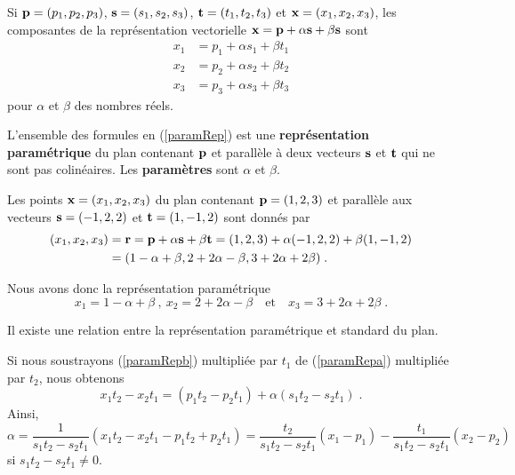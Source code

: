 {Si $\mathbf{p}=(p_1,p_2,p_3)$, $\mathbf{s} = (s_1,s_2,s_3)$,
$\mathbf{t}=(t_1,t_2,t_3)$ et $\mathbf{x}=(x_1,x_2,x_3)$, les composantes de la
représentation vectorielle
$\mathbf{x} = \mathbf{p} + \alpha \mathbf{s} + \beta \mathbf{s}$ sont
\begin{subequations} \label{paramRep}
\begin{align}
x_1 &= p_1 + \alpha s_1 + \beta t_1 \label{paramRepa} \\
x_2 &= p_2 + \alpha s_2 + \beta t_2 \label{paramRepb} \\
x_3 &= p_3 + \alpha s_3 + \beta t_3 \label{paramRepc}
\end{align}
\end{subequations}
pour $\alpha$ et $\beta$ des nombres réels.

\begin{focus}{\dfn} 
L'ensemble des formules en (\ref{paramRep}) est une {\bfseries
représentation paramétrique} du plan contenant $\mathbf{p}$ et parallèle
à deux vecteurs $\mathbf{s}$ et $\mathbf{t}$ qui ne sont pas colinéaires.
Les {\bfseries paramètres} sont $\alpha$ et $\beta$.
\end{focus}

\begin{egg}
Les points $\mathbf{x}=(x_1,x_2,x_3)$ du plan contenant $\mathbf{p}=(1,2,3)$ et
parallèle aux vecteurs $\mathbf{s}=(-1,2,2)$ et $\mathbf{t}=(1,-1,2)$ sont
donnés par
\begin{align*}
(x_1,x_2,x_3) &= \mathbf{r} = \mathbf{p} + \alpha \mathbf{s} + \beta \mathbf{t}
= (1,2,3) + \alpha (-1,2,2) + \beta (1,-1,2) \\
&= (1-\alpha +\beta, 2 +2 \alpha - \beta, 3 + 2\alpha +2\beta) \; .
\end{align*}

Nous avons donc la représentation paramétrique
\[
x_1 = 1-\alpha+\beta \ , \ x_2 = 2+2\alpha-\beta \quad \text{et} \quad 
x_3 = 3+2\alpha + 2\beta \; .
\]
\end{egg}

\begin{rmk}[\theory]
Il existe une relation entre la représentation paramétrique et standard du
plan.

Si nous soustrayons (\ref{paramRepb}) multipliée par $t_1$ de
(\ref{paramRepa}) multipliée par $t_2$, nous obtenons
\[
x_1 t_2 - x_2 t_1 = (p_1 t_2 - p_2 t_1) + \alpha (s_1 t_2 - s_2 t_1) \; .
\]
Ainsi,
\[
\alpha = \frac{1}{s_1 t_2 - s_2 t_1}
\left(x_1 t_2 - x_2 t_1 - p_1 t_2 + p_2 t_1\right) = 
\frac{t_2}{s_1 t_2 - s_2 t_1} \left(x_1 - p_1\right)
-\frac{t_1}{s_1 t_2 - s_2 t_1} \left(x_2 - p_2\right)
\]
si $s_1 t_2 - s_2 t_1 \neq 0$.


\end{rmk}}
